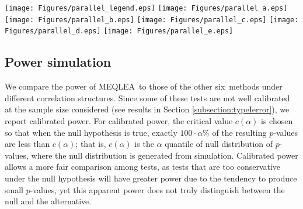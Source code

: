 \documentclass[useAMS,usenatbib, galley]{biom}
\newcommand{\OurMethod}{MEQLEA}
\newcommand{\HowmanyTest}{six}
\newcommand{\aaCase}{a}
\newcommand{\fCase}{e}
\newcommand{\HowmanySimu}{$1,000$}
\begin{document}
\begin{figure*}[!th]
	\begin{center}
	\texttt{[image: Figures/parallel\_legend.eps]}
	\texttt{[image: Figures/parallel\_a.eps]}
	\texttt{[image: Figures/parallel\_b.eps]}
	\texttt{[image: Figures/parallel\_c.eps]}
	\texttt{[image: Figures/parallel\_d.eps]}
	\texttt{[image: Figures/parallel\_e.eps]}
	\end{center} 
	\caption{Uniform quantile-quantile plots for $p$-values by different methods. Each plot from top to bottom corresponds to correlation structures (\aaCase)-(\fCase), respectively. The left column is for group $A_1$ simulation, and the right column for group $A_2$ simulation (see Table \ref{table:simusetup} for detail). Results are based on \HowmanySimu~simulations.}\label{fig:typeIerror}
\end{figure*} 

	
	\subsection{Power simulation}\label{subsection:power}		 


	
	We compare the power of \OurMethod~to those of the other \HowmanyTest~methods under different correlation structures. Since some of these tests are not well calibrated at the sample size considered (see results in Section \ref{subsection:typeIerror}), we report calibrated power. For calibrated power, the critical value $c(\alpha)$ is chosen so that when the null hypothesis is true, exactly $100\cdot\alpha\%$ of the resulting $p$-values are less than $c(\alpha)$; that is, $c(\alpha)$ is  the $\alpha$ quantile of null distribution of $p$-values, where the null distribution is generated from simulation. Calibrated power allows a more fair comparison among tests, as tests that are too conservative under the null hypothesis will have greater power due to the tendency to produce small $p$-values, yet this apparent power does not truly distinguish between the null and the alternative.  
	
\end{document}
